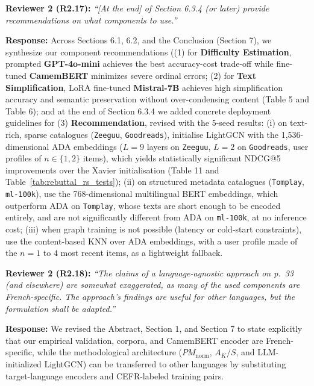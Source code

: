 \documentclass[11pt,a4paper]{article}
\newcommand{\mm}[1]{#1}
\begin{document}
\begin{reviewbox}
\textbf{Reviewer 2 (R2.17):} \textit{``[At the end] of Section 6.3.4 (or later) provide recommendations on what components to use.''}
\end{reviewbox}

\noindent\textbf{Response:}
Across Sections 6.1, 6.2, and the Conclusion (Section 7), we synthesize our component recommendations ((1) for \textbf{Difficulty Estimation}, prompted \textbf{GPT-4o-mini} achieves the best accuracy-cost trade-off while fine-tuned \textbf{CamemBERT} minimizes severe ordinal errors; (2) for \textbf{Text Simplification}, LoRA fine-tuned \textbf{Mistral-7B} achieves high simplification accuracy and semantic preservation without over-condensing content (Table 5 and Table 6); and at the end of Section 6.3.4 we added concrete deployment guidelines for (3) \textbf{Recommendation}, \mm{revised with the 5-seed results: (i) on text-rich, sparse catalogues (\texttt{Zeeguu}, \texttt{Goodreads}), initialise LightGCN with the 1,536-dimensional ADA embeddings ($L = 9$ layers on \texttt{Zeeguu}, $L = 2$ on \texttt{Goodreads}, user profiles of $n \in \{1, 2\}$ items), which yields statistically significant NDCG@5 improvements over the Xavier initialisation (Table 11 and Table~\ref{tab:rebuttal_rs_tests}); (ii) on structured metadata catalogues (\texttt{Tomplay}, \texttt{ml-100k}), use the 768-dimensional multilingual BERT embeddings, which outperform ADA on \texttt{Tomplay}, whose texts are short enough to be encoded entirely, and are not significantly different from ADA on \texttt{ml-100k}, at no inference cost; (iii) when graph training is not possible (latency or cold-start constraints), use the content-based KNN over ADA embeddings, with a user profile made of the $n = 1$ to $4$ most recent items, as a lightweight fallback.}

\begin{reviewbox}
\textbf{Reviewer 2 (R2.18):} \textit{``The claims of a language-agnostic approach on p.\ 33 (and elsewhere) are somewhat exaggerated, as many of the used components are French-specific. The approach's findings are useful for other languages, but the formulation shall be adapted.''}
\end{reviewbox}

\noindent\textbf{Response:}
We revised the Abstract, Section 1, and Section 7 to state explicitly that our empirical validation, corpora, and CamemBERT encoder are French-specific, while the methodological architecture ($PM_{\text{norm}}$, $A_K/S$, and LLM-initialized LightGCN) can be transferred to other languages by substituting target-language encoders and CEFR-labeled training pairs.
\end{document}
